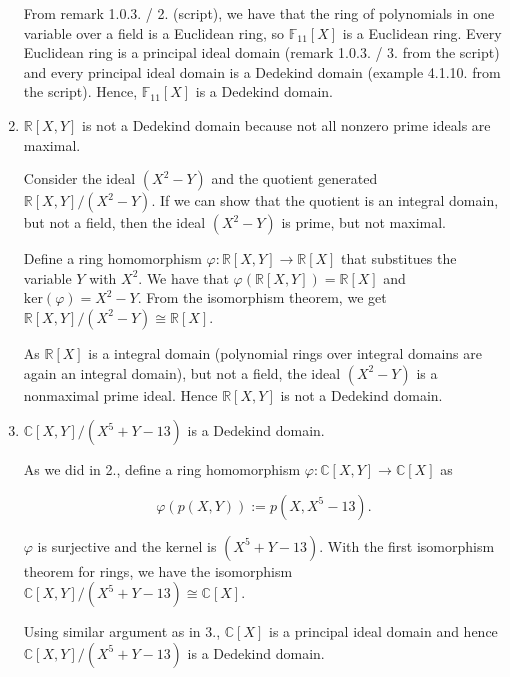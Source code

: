 \documentclass[a4paper]{article}
\theoremstyle{definition}
\begin{document}
\begin{enumerate}
    From remark 1.0.3. / 2. (script), we have that the ring of polynomials in one variable over a field is a Euclidean ring, so \(\mathbb{F}_{11}[X]\) is a Euclidean ring. Every Euclidean ring is a principal ideal domain (remark 1.0.3. / 3. from the script) and every principal ideal domain is a Dedekind domain (example 4.1.10. from the script). Hence, \(\mathbb{F}_{11}[X]\) is a Dedekind domain.
    \item \(\mathbb{R}[X, Y]\) is not a Dedekind domain because not all nonzero prime ideals are maximal.

    Consider the ideal \((X^2 - Y)\) and the quotient generated \(\mathbb{R}[X, Y] / (X^2 - Y)\). If we can show that the quotient is an integral domain, but not a field, then the ideal \((X^2 - Y)\) is prime, but not maximal.

    Define a ring homomorphism \(\varphi: \mathbb{R}[X, Y] \rightarrow \mathbb{R}[X]\) that substitues the variable \(Y\) with \(X^2\). We have that \(\varphi(\mathbb{R}[X, Y]) = \mathbb{R}[X]\) and \(\text{ker}(\varphi) = X^2 - Y\). From the isomorphism theorem, we get \(\mathbb{R}[X, Y] / (X^2 - Y) \cong \mathbb{R}[X]\).

    As \(\mathbb{R}[X]\) is a integral domain (polynomial rings over integral domains are again an integral domain), but not a field, the ideal \((X^2 - Y)\) is a nonmaximal prime ideal. Hence \(\mathbb{R}[X, Y]\) is not a Dedekind domain.
    \item \(\mathbb{C}[X, Y] / (X^5 + Y - 13)\) is a Dedekind domain.
    
    As we did in 2., define a ring homomorphism \(\varphi: \mathbb{C}[X, Y] \rightarrow \mathbb{C}[X]\) as

    \begin{equation}
        \varphi(p(X, Y)) := p(X, X^5 - 13) \text{.} 
    \end{equation}

    \(\varphi\) is surjective and the kernel is \((X^5 + Y - 13)\). With the first isomorphism theorem for rings, we have the isomorphism \(\mathbb{C}[X, Y] / (X^5 + Y - 13) \cong \mathbb{C}[X]\).

    Using similar argument as in 3., \(\mathbb{C}[X]\) is a principal ideal domain and hence \(\mathbb{C}[X, Y] / (X^5 + Y - 13)\) is a Dedekind domain.
\end{enumerate}
\end{document}
